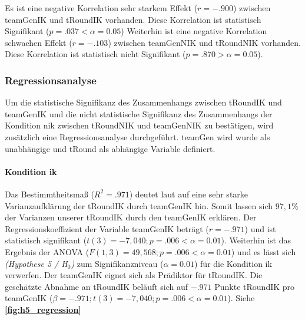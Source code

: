 \documentclass[a4paper,11pt]{article}%
\renewcommand{\\}{\vspace*{0.5\baselineskip} \newline}
\begin{document}
Es ist eine negative Korrelation sehr starkem Effekt ($r = -.900$) zwischen \ac{teamGenIK} und \ac{tRoundIK} vorhanden. Diese Korrelation ist statistisch Signifikant ($p = .037 < \alpha = 0.05$)
Weiterhin ist eine negative Korrelation schwachen Effekt ($r = -.103$) zwischen \ac{teamGenNIK} und \ac{tRoundNIK} vorhanden. Diese Korrelation ist statistisch nicht Signifikant ($p = .870 > \alpha = 0.05$).

		\subsubsection{Regressionsanalyse}
Um die statistische Signifikanz des Zusammenhangs zwischen \ac{tRoundIK} und \ac{teamGenIK} und die nicht statistische Signifikanz des Zusammenhangs der Kondition \ac{nik} zwischen \ac{tRoundNIK} und \ac{teamGenNIK} zu bestätigen, wird zusätzlich eine Regressionsanalyse durchgeführt.
\ac{teamGen} wird wurde als unabhängige und \ac{tRound} als abhängige Variable definiert.

\paragraph{Kondition \ac{ik}}
Das Bestimmtheitsmaß ($R^{2} = .971$) deutet laut \citep{cohen2013statistical} auf eine sehr starke Varianzaufklärung der \ac{tRoundIK} durch \ac{teamGenIK} hin. Somit lassen sich $97,1\%$ der Varianzen unserer \ac{tRoundIK} durch den \ac{teamGenIK} erklären. \\
Der Regressionskoeffizient der Variable \ac{teamGenIK} beträgt ($r = -.971$) und ist statistisch signifikant ($t(3) = -7,040; p = .006 < \alpha = 0.01$). \\
Weiterhin ist das Ergebnis der ANOVA ($F(1,3) = 49,568; p = .006 < \alpha = 0.01$) und es lässt sich \textit{(Hypothese 5 / H$_{0}$)} zum Signifikanzniveau ($\alpha = 0.01$) für die Kondition \ac{ik} verwerfen. \\
Der \ac{teamGenIK} eignet sich als Prädiktor für \ac{tRoundIK}. Die geschätzte Abnahme an \ac{tRoundIK} beläuft sich auf $-.971$ Punkte \ac{tRoundIK} pro \ac{teamGenIK} ($\beta = -.971; t(3) = -7,040; p = .006 < \alpha = 0.01$). \\
Siehe \textbf{\autoref{fig:h5_regression}}
\end{document}
